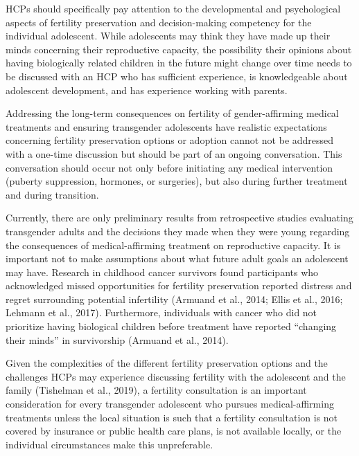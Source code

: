 \documentclass[
]{book}
\begin{document}
HCPs should specifically pay attention to the
developmental and psychological aspects of fertility preservation and decision-making competency for the individual adolescent. While
adolescents may think they have made up their
minds concerning their reproductive capacity, the
possibility their opinions about having
biologically related children in the future might
change over time needs to be discussed with an
HCP who has sufficient experience, is knowledgeable about adolescent development, and has
experience working with parents.

Addressing the long-term consequences on fertility of gender-affirming medical treatments and
ensuring transgender adolescents have realistic
expectations concerning fertility preservation
options or adoption cannot not be addressed with
a one-time discussion but should be part of an
ongoing conversation. This conversation should
occur not only before initiating any medical
intervention (puberty suppression, hormones, or
surgeries), but also during further treatment and
during transition.

Currently, there are only preliminary results
from retrospective studies evaluating transgender
adults and the decisions they made when they
were young regarding the consequences of
medical-affirming treatment on reproductive
capacity. It is important not to make assumptions
about what future adult goals an adolescent may
have. Research in childhood cancer survivors
found participants who acknowledged missed
opportunities for fertility preservation reported
distress and regret surrounding potential infertility
(Armuand et al., 2014; Ellis et al., 2016; Lehmann
et al., 2017). Furthermore, individuals with cancer
who did not prioritize having biological children
before treatment have reported ``changing their
minds'' in survivorship (Armuand et al., 2014).

Given the complexities of the different fertility
preservation options and the challenges HCPs
may experience discussing fertility with the adolescent and the family (Tishelman et al., 2019),
a fertility consultation is an important consideration for every transgender adolescent who pursues medical-affirming treatments unless the local
situation is such that a fertility consultation is
not covered by insurance or public health care
plans, is not available locally, or the individual
circumstances make this unpreferable.
\end{document}
